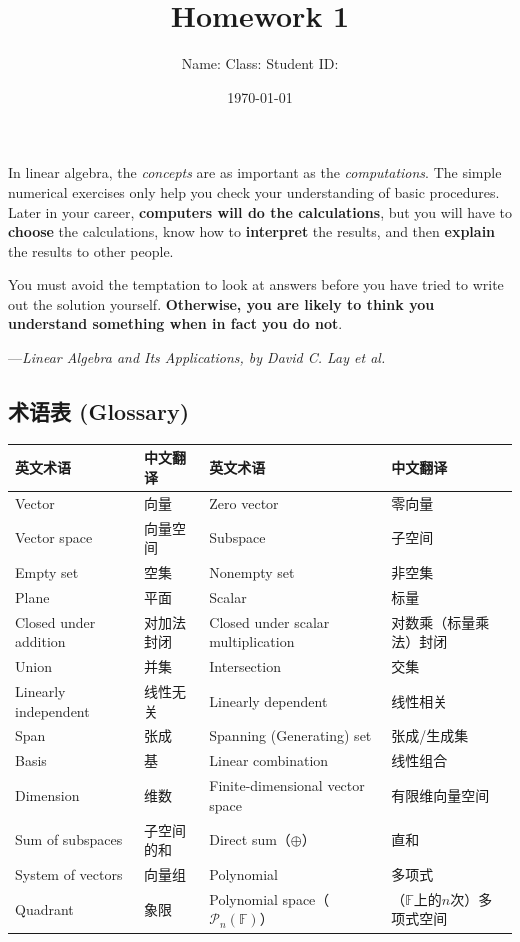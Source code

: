 \documentclass[a4paper,11pt]{article}
\title{Homework 1}
\author{Name:\hspace{5em} Class:\hspace{7em} Student ID: \qquad\qquad}
\date{\today}
\begin{document}
\maketitle
In linear algebra, the {\it concepts} are as important as the {\it computations}. The simple
numerical exercises only help you check your understanding
of basic procedures. Later in your career, {\bf computers will do the calculations}, but you
will have to {\bf choose} the calculations, know how to {\bf interpret} the results, and then {\bf explain}
the results to other people.

You must avoid the temptation to look at answers before you have tried
to write out the solution yourself. {\bf Otherwise, you are likely to think you understand
something when in fact you do not}.

{\hfill ---{\it Linear Algebra and Its Applications, by David C. Lay et al.}}

\subsection*{术语表 (Glossary)}
\begin{center}
\begin{tabular}{llll}
\hline
\textbf{英文术语} & \textbf{中文翻译} & \textbf{英文术语} & \textbf{中文翻译} \\
\hline
Vector & 向量 & Zero vector & 零向量 \\
Vector space & 向量空间 & Subspace & 子空间 \\
Empty set & 空集 & Nonempty set & 非空集 \\
Plane & 平面 & Scalar & 标量 \\
Closed under addition & 对加法封闭 & Closed under scalar multiplication & 对数乘（标量乘法）封闭 \\
Union & 并集 & Intersection & 交集 \\
Linearly independent & 线性无关 & Linearly dependent & 线性相关 \\
Span & 张成 & Spanning (Generating) set & 张成/生成集 \\
Basis & 基 & Linear combination & 线性组合 \\
Dimension & 维数 & Finite-dimensional vector space & 有限维向量空间 \\
Sum of subspaces & 子空间的和 & Direct sum（$\oplus$） & 直和 \\
System of vectors & 向量组 & Polynomial & 多项式 \\
Quadrant & 象限 & Polynomial space（$\mathcal{P}_n(\mathbb{F})$） & （$\mathbb{F}$上的$n$次）多项式空间 \\
\hline
\end{tabular}
\end{center}
\end{document}
